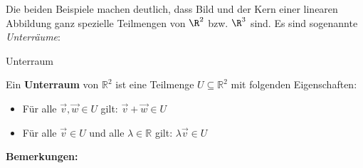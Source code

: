 Die beiden Beispiele machen deutlich, dass Bild und der Kern einer linearen Abbildung ganz spezielle Teilmengen von $\R^2$ bzw. $\R^3$ sind. Es sind sogenannte \emph{Unterräume}:













\pagebreak
\begin{definition}
    {Unterraum}{}

Ein \textbf{Unterraum} von \( \mathbb{R}^2 \)  ist eine Teilmenge \( U \subseteq \mathbb{R}^2 \) mit folgenden Eigenschaften:
\begin{itemize}
  \item Für alle \( \vec{v}, \vec{w} \in U \) gilt: \( \vec{v} + \vec{w} \in U \)
  \item Für alle \( \vec{v} \in U \) und alle \( \lambda \in \mathbb{R} \) gilt: \( \lambda \vec{v} \in U \)
\end{itemize}

    \end{definition}

\textbf{Bemerkungen:} 

